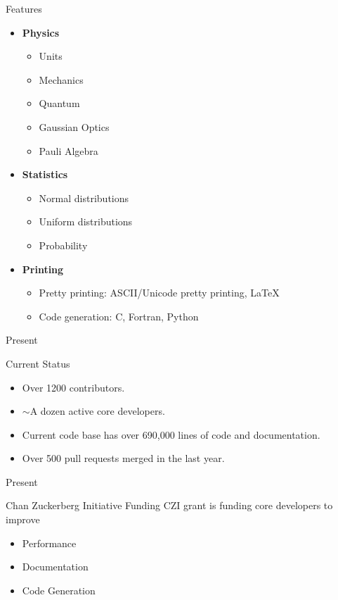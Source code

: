 \documentclass[xcolor=svgnames]{beamer}
\begin{document}
\begin{frame}{Features}
\begin{multicols}{2}
\begin{itemize}
    \item \textbf{Physics}
      \begin{itemize}
        \tiny
      \item Units
      \item Mechanics
      \item Quantum
      \item Gaussian Optics
      \item Pauli Algebra
      \end{itemize}

    \item \textbf{Statistics}
      \begin{itemize}
        \tiny
      \item Normal distributions
      \item Uniform distributions
      \item Probability
      \end{itemize}

    \item \textbf{Printing}
      \begin{itemize}
        \tiny
      \item Pretty printing: ASCII/Unicode pretty printing, LaTeX
      \item Code generation: C, Fortran, Python
      \end{itemize}
    \end{itemize}
  \end{multicols}
\end{frame}

\begin{frame}{Present}
  \begin{block}{Current Status}
    \begin{itemize}
    \item Over 1200 contributors.
    \item $\sim$A dozen active core developers.
    \item Current code base has over 690,000 lines of code and documentation.
    \item Over 500 pull requests merged in the last year.
    \end{itemize}
  \end{block}
\end{frame}

\begin{frame}{Present}
  \begin{block}{Chan Zuckerberg Initiative Funding}
    CZI grant is funding core developers to improve
    \begin{itemize}
    \item Performance
    \item Documentation
    \item Code Generation
    \end{itemize}
  \end{block}
\end{frame}
\end{document}
